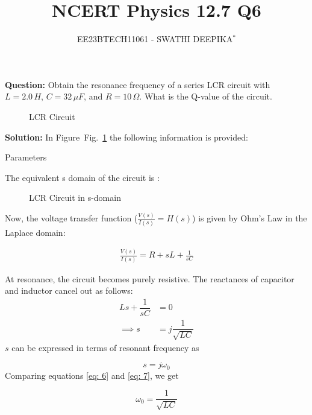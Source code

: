 \documentclass[journal,12pt,twocolumn]{IEEEtran}
\title{
	
\title{NCERT Physics 12.7 Q6}
\author{EE23BTECH11061 - SWATHI DEEPIKA$^{*}$%
}


}
\newcommand\figref{Fig.~\ref}
\theoremstyle{remark}
\begin{document}
\maketitle

\textbf{Question:} 
Obtain the resonance frequency of a series LCR circuit with $L = 2.0\, H$, $C = 32\, \mu F$, and $R = 10\, \Omega$. What is the Q-value of the circuit.\\

\begin{figure}[!h]
	\centering
	
	\caption{LCR Circuit}
	\label{fig:2}
\end{figure}
     
\textbf{Solution: }
In Figure~\figref{fig:2} the following information is provided:
 
 

 \begin{table}[h]
 	\centering
 	\resizebox{6 cm}{!}{
 		
 	}
 	\vspace{6 pt}
 	\caption{Parameters}
 	\label{tab:my_label} 
 \end{table}
 
 The equivalent s domain of the circuit is :

\begin{figure}[!h]
 \centering
    
    \caption{LCR Circuit in s-domain}
    
\end{figure}

Now, the voltage transfer function (\(\frac{V(s)}{I(s)} = H(s)\)) is given by Ohm's Law in the Laplace domain:

\begin{align}
\frac{V(s)}{I(s)} = R + sL + \frac{1}{sC}\label{eq: 1} 
\end{align}

At resonance, the circuit becomes purely resistive. The reactances of capacitor and inductor cancel out as follows:
\begin{align}
    Ls + \dfrac{1}{sC} &= 0\\
    \implies s &= j\dfrac{1}{\sqrt{LC}} \label{eq: 6}
\end{align}
$s$ can be expressed in terms of resonant frequency as

\begin{equation}
    s = j\omega_0 \label{eq: 7}
\end{equation}
Comparing equations \eqref{eq: 6} and \eqref{eq: 7}, we get

\begin{equation}
    \omega_0 = \dfrac{1}{\sqrt{LC}}\label{eq: 8}
\end{equation}
\end{document}
